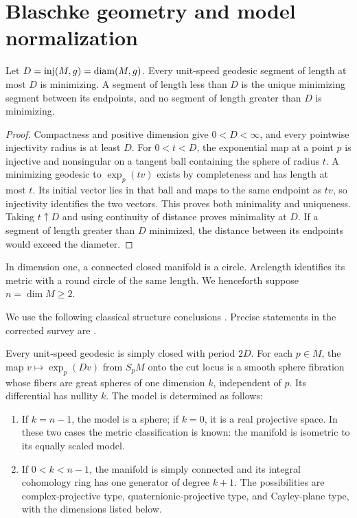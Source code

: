 \section{Blaschke geometry and model normalization}
\label{geom:section}

\begin{lemma}\label{geom:cut-time}
Let $D=\operatorname{inj}(M,g)=\operatorname{diam}(M,g)$. Every unit-speed geodesic segment
of length at most $D$ is minimizing. A segment of length less than
$D$ is the unique minimizing segment between its endpoints, and
no segment of length greater than $D$ is minimizing.
\end{lemma}

\begin{proof}
Compactness and positive dimension give $0<D<\infty$, and every
pointwise injectivity radius is at least $D$. For $0<t<D$, the
exponential map at a point $p$ is injective and nonsingular on a
tangent ball containing the sphere of radius $t$. A minimizing
geodesic to $\exp_p(tv)$ exists by completeness and has length at
most $t$. Its initial vector lies in that ball and maps to the same
endpoint as $tv$, so injectivity identifies the two vectors.
This proves both minimality and uniqueness. Taking $t\uparrow D$
and using continuity of distance proves minimality at $D$.
If a segment of length greater than $D$ minimized, the distance
between its endpoints would exceed the diameter.
\end{proof}

In dimension one, a connected closed manifold is a circle.
Arclength identifies its metric with a round circle of the same
length. We henceforth suppose $n=\dim M\ge2$.

We use the following classical structure conclusions
\citep[Chapters~5 and~7]{Besse1978}. Precise statements in the corrected
survey are \citet[Section~4, Corollary~1, Theorem~1, and
Sections~7, 11--12]{McKay2016}.

\begin{proposition}
\label{geom:structure}
Every unit-speed geodesic is simply closed with period $2D$.
For each $p\in M$, the map $v\mapsto\exp_p(Dv)$ from $S_pM$
onto the cut locus is a smooth sphere fibration whose fibers are
great spheres of one dimension $k$, independent of $p$. Its
differential has nullity $k$. The model is determined as follows:
\begin{enumerate}[label=\textup{(\roman*)}]
\item If $k=n-1$, the model is a sphere; if $k=0$, it is a real
projective space. In these two cases the metric classification is
known: the manifold is isometric to its equally scaled model.
\item If $0<k<n-1$, the manifold is simply connected and its
integral cohomology ring has one generator of degree $k+1$.
The possibilities are complex-projective type, quaternionic-projective
type, and Cayley-plane type, with the dimensions listed below.
\end{enumerate}
\end{proposition}

